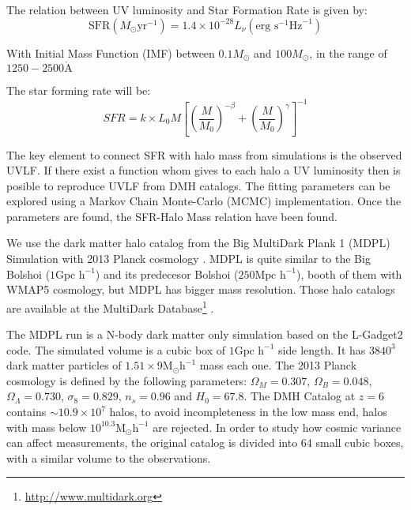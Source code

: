 \documentclass{emulateapj}
\begin{document}
The relation between UV luminosity and Star Formation Rate
\citep{Madau98,Kennicutt98} 
is given by:
\begin{equation}
 \textrm{SFR}\left(M_\odot \textrm{yr}^{-1}\right) 
      = 1.4 \times 10^{-28} L_{\nu} \left( \textrm{erg s}^{-1}\textrm{Hz}^{-1} 
	\right)
\end{equation}


  With Initial Mass Function (IMF) between $0.1 M_\odot$ 
 and $100 M_\odot$, in the range of $1250-2500 \mathring{\textrm{A}} $

The star forming rate will be:
  \begin{equation}
  SFR = k \times L_{0} M \left[ \left( \frac{M}{M_0}\right)^{-\beta} 
		   + \left( \frac{M}{M_0}\right)^{\gamma} 
               \right]^{-1}
  \end{equation}

The key element to connect SFR with halo mass from simulations is the observed 
UVLF. If there exist a function whom gives to each halo a UV luminosity then is 
posible to reproduce UVLF from DMH catalogs. The fitting parameters can be 
explored using a Markov Chain Monte-Carlo (MCMC) implementation. Once the 
parameters are found, the SFR-Halo Mass relation have been found.

We use the dark matter halo catalog from the Big MultiDark Plank 1 (MDPL) 
Simulation \citep{Klypin14} with 2013 Planck cosmology \citep{Planck1}. MDPL is 
quite similar to the Big Bolshoi ($1 \textrm{Gpc h}^{-1}$) \citep{Prada12} and 
its predecesor Bolshoi \citep{Klypin11} ($250 \textrm{Mpc h}^{-1}$), booth of 
them with WMAP5 cosmology, but MDPL has bigger mass resolution.  Those halo 
catalogs are available at the MultiDark 
Database\footnote{\url{http://www.multidark.org}} \citep{Riebe13}.

The MDPL run is a N-body dark matter only simulation based on the L-Gadget2 
code. The simulated volume is a cubic box of $1 \textrm{Gpc h}^{-1}$ side 
length. It has $3840^3$ dark matter particles of  $1.51\times 9
\textrm{M}_{\odot} \textrm{h}^{-1}$ mass each one. The 2013 Planck
cosmology is defined by the following parameters: $\Omega_M = 0.307$,
$\Omega_B = 0.048$, $\Omega_\Lambda = 0.730$, $\sigma_8 = 0.829$, $n_s
= 0.96$ and  $H_0 = 67.8$. The DMH Catalog at $z=6$ contains $\sim
10.9 \times 10^7$   halos, to avoid incompleteness in the low mass
end, halos with mass below   $10^{10.3} \textrm{M}_{\odot}
\textrm{h}^{-1}$ are rejected. In order to study how  
cosmic variance can affect measurements, the original catalog is
divided into 64 small   cubic boxes, with a similar volume to the
observations. 
\end{document}
